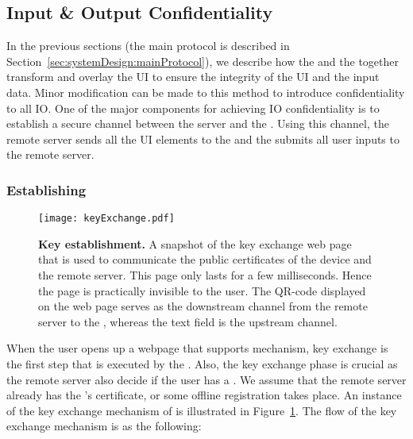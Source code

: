 \subsection{Input \& Output Confidentiality}
\label{sec:systemDesign:confidentiality}


In the previous sections (the main protocol is described in Section~\ref{sec:systemDesign:mainProtocol}), we describe how the \name \js and the \device together transform and overlay the UI to ensure the integrity of the UI and the input data. Minor modification can be made to this method to introduce confidentiality to all IO. One of the major components for achieving IO confidentiality is to establish a secure channel between the server and the \device. Using this \tls channel, the remote server sends all the UI elements to the \device and the \device submits all user inputs to the remote server.

\subsubsection{\bfseries Establishing \tls}
\label{sec:systemDesign:confidentiality:tls}

\begin{figure}[t]
\centering
\texttt{[image: keyExchange.pdf]}
\caption{\textbf{Key establishment.} A snapshot of the key exchange web page that is used to communicate the public certificates of the device and the remote server. This page only lasts for a few milliseconds. Hence the page is practically invisible to the user. The QR-code displayed on the web page serves as the downstream channel from the remote server to the \device, whereas the text field is the upstream channel.}
\label{fig:keyExchange}
\centering
\end{figure} 


When the user opens up a webpage that supports \name mechanism, key exchange is the first step that is executed by the \device. Also, the key exchange phase is crucial as the remote server also decide if the user has a \device. We assume that the remote server already has the \device's certificate, or some offline registration takes place. An instance of the key exchange mechanism of \name is illustrated in Figure~\ref{fig:keyExchange}. The flow of the key exchange mechanism is as the following:

